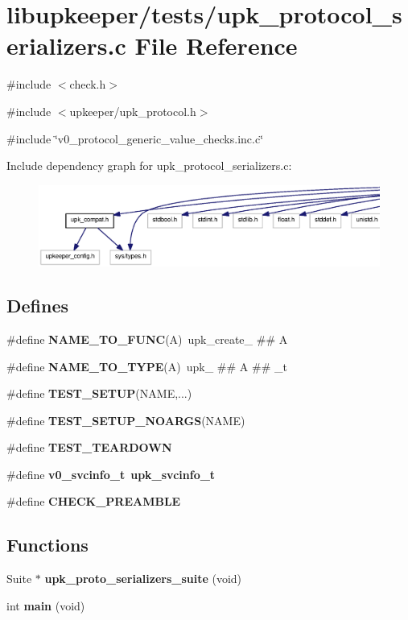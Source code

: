 \section{libupkeeper/tests/upk\_\-protocol\_\-serializers.c File Reference}
\label{upk__protocol__serializers_8c}
{\ttfamily \#include $<$check.h$>$}\par
{\ttfamily \#include $<$upkeeper/upk\_\-protocol.h$>$}\par
{\ttfamily \#include \char`\"{}v0\_\-protocol\_\-generic\_\-value\_\-checks.inc.c\char`\"{}}\par
Include dependency graph for upk\_\-protocol\_\-serializers.c:
\nopagebreak
\begin{figure}[H]
\begin{center}
\leavevmode
\includegraphics[width=400pt]{upk__protocol__serializers_8c__incl}
\end{center}
\end{figure}
\subsection*{Defines}
\begin{DoxyCompactItemize}
\item 
\#define {\bf NAME\_\-TO\_\-FUNC}(A)~upk\_\-create\_\- \#\# A
\item 
\#define {\bf NAME\_\-TO\_\-TYPE}(A)~upk\_\- \#\# A \#\# \_\-t
\item 
\#define {\bf TEST\_\-SETUP}(NAME,...)
\item 
\#define {\bf TEST\_\-SETUP\_\-NOARGS}(NAME)
\item 
\#define {\bf TEST\_\-TEARDOWN}
\item 
\#define {\bf v0\_\-svcinfo\_\-t}~{\bf upk\_\-svcinfo\_\-t}
\item 
\#define {\bf CHECK\_\-PREAMBLE}
\end{DoxyCompactItemize}
\subsection*{Functions}
\begin{DoxyCompactItemize}
\item 
Suite $\ast$ {\bf upk\_\-proto\_\-serializers\_\-suite} (void)
\item 
int {\bf main} (void)
\end{DoxyCompactItemize}


